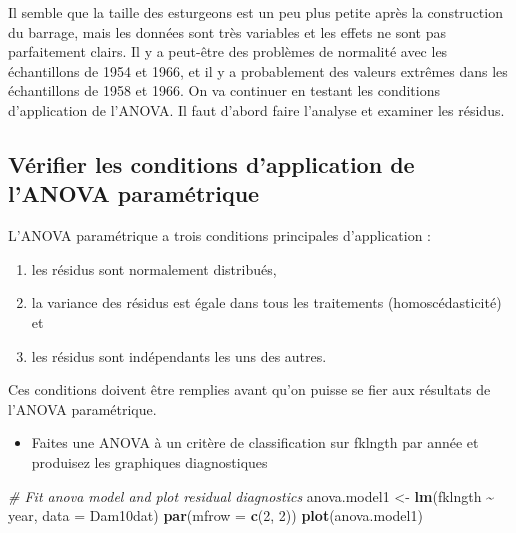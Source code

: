 \documentclass[
  12pt,
]{book}
\newenvironment{Shaded}{\begin{snugshade}}{\end{snugshade}}
\newcommand{\CommentTok}[1]{\textcolor[rgb]{0.56,0.35,0.01}{\textit{#1}}}
\newcommand{\DataTypeTok}[1]{\textcolor[rgb]{0.13,0.29,0.53}{#1}}
\newcommand{\DecValTok}[1]{\textcolor[rgb]{0.00,0.00,0.81}{#1}}
\newcommand{\KeywordTok}[1]{\textcolor[rgb]{0.13,0.29,0.53}{\textbf{#1}}}
\newcommand{\NormalTok}[1]{#1}
\newcommand{\OperatorTok}[1]{\textcolor[rgb]{0.81,0.36,0.00}{\textbf{#1}}}
\newcommand{\StringTok}[1]{\textcolor[rgb]{0.31,0.60,0.02}{#1}}
\providecommand{\tightlist}{%
  \setlength{\itemsep}{0pt}\setlength{\parskip}{0pt}}
\begin{document}
Il semble que la taille des esturgeons est un peu plus petite après la construction du barrage, mais les données sont très variables et les effets ne sont pas parfaitement clairs. Il y a peut-être des problèmes de normalité avec les échantillons de 1954 et 1966, et il y a probablement des valeurs extrêmes dans les échantillons de 1958 et 1966. On va continuer en testant les conditions d'application de l'ANOVA. Il faut d'abord faire l'analyse et examiner les résidus.

\hypertarget{vuxe9rifier-les-conditions-dapplication-de-lanova-paramuxe9trique}{%
\subsection{Vérifier les conditions d'application de l'ANOVA paramétrique}\label{vuxe9rifier-les-conditions-dapplication-de-lanova-paramuxe9trique}}

L'ANOVA paramétrique a trois conditions principales d'application :

\begin{enumerate}
\def\labelenumi{\arabic{enumi}.}
\tightlist
\item
  les résidus sont normalement distribués,
\item
  la variance des résidus est égale dans tous les traitements (homoscédasticité) et
\item
  les résidus sont indépendants les uns des autres.
\end{enumerate}

Ces conditions doivent être remplies avant qu'on puisse se fier aux résultats de l'ANOVA paramétrique.

\begin{itemize}
\tightlist
\item
  Faites une ANOVA à un critère de classification sur fklngth par année et produisez les graphiques diagnostiques
\end{itemize}

\begin{Shaded}
\begin{Highlighting}[]
\CommentTok{\# Fit anova model and plot residual diagnostics}
\NormalTok{anova.model1 \textless{}{-}}\StringTok{ }\KeywordTok{lm}\NormalTok{(fklngth }\OperatorTok{\textasciitilde{}}\StringTok{ }\NormalTok{year, }\DataTypeTok{data =}\NormalTok{ Dam10dat)}
\KeywordTok{par}\NormalTok{(}\DataTypeTok{mfrow =} \KeywordTok{c}\NormalTok{(}\DecValTok{2}\NormalTok{, }\DecValTok{2}\NormalTok{))}
\KeywordTok{plot}\NormalTok{(anova.model1)}
\end{Highlighting}
\end{Shaded}
\end{document}
